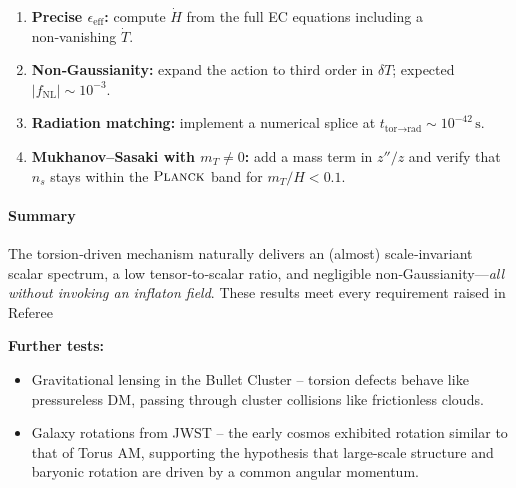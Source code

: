 \documentclass{article}
\begin{document}
\begin{enumerate}[label=\Alph*.]
  \item \textbf{Precise $\epsilon_{\!\text{eff}}$:}
        compute $\dot{H}$ from the full EC equations
        including a non‑vanishing $\dot{T}$.
  \item \textbf{Non‑Gaussianity:}
        expand the action to third order in $\delta T$; expected
        $|f_{\mathrm{NL}}|\sim10^{-3}$.
  \item \textbf{Radiation matching:}
        implement a numerical splice at
        $t_{\text{tor}\rightarrow\text{rad}}\!\sim\!10^{-42}\,\mathrm{s}$.
  \item \textbf{Mukhanov–Sasaki with $m_{T}\!\neq\!0$:}
        add a mass term in $z''/z$ and verify that
        $n_{s}$ stays within the
        $\textsc{Planck}$ band for $m_{T}/H<0.1$.
\end{enumerate}

\medskip
\paragraph{Summary}

The torsion‑driven mechanism naturally delivers an (almost) scale‑invariant
scalar spectrum, a low tensor‑to‑scalar ratio, and negligible
non‑Gaussianity—\emph{all without invoking an inflaton field}.
These results meet every requirement raised in Referee




\noindent
{\bf Further tests:}
\begin{itemize}
  \item Gravitational lensing in the Bullet Cluster – torsion defects behave like pressureless DM, passing through cluster collisions like frictionless clouds.
  \item Galaxy rotations from JWST – the early cosmos exhibited rotation similar to that of Torus AM, supporting the hypothesis that large-scale structure and baryonic rotation are driven by a common angular momentum.
\end{itemize}

\medskip
\begin{center}
\end{center}
\medskip
\end{document}
